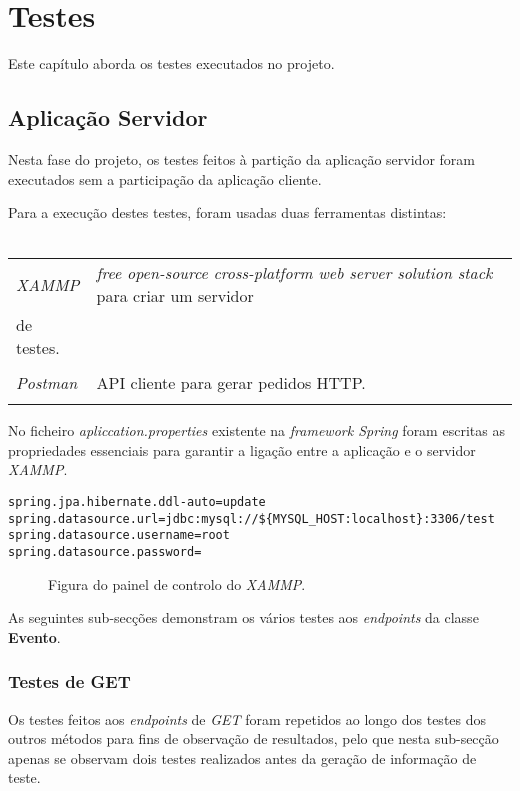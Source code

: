 %
%
\chapter{Testes} \label{testes}
Este capítulo aborda os testes executados no projeto.

\section{Aplicação Servidor} \label{sec51}
Nesta fase do projeto, os testes feitos à partição da aplicação servidor foram executados sem a participação da aplicação cliente.

Para a execução destes testes, foram usadas duas ferramentas distintas:\\
\\
\begin{tabular}{ll}
	\emph{XAMMP} & \emph{free open-source cross-platform web server solution stack} para criar um servidor\\
	 de testes.\\
	 \\
	\emph{Postman} & API cliente para gerar pedidos HTTP.\\
	\\
\end{tabular}

No ficheiro \emph{apliccation.properties} existente na \emph{framework Spring} foram escritas as propriedades essenciais para garantir a ligação entre a aplicação e o servidor \emph{XAMMP}.

\begin{verbatim}
spring.jpa.hibernate.ddl-auto=update
spring.datasource.url=jdbc:mysql://${MYSQL_HOST:localhost}:3306/test
spring.datasource.username=root
spring.datasource.password=
\end{verbatim}

\begin{figure}[h]
	\begin{center}
	\end{center}
	\caption{Figura do painel de controlo do \emph{XAMMP}.}\label{fig:logotipo}
\end{figure}

As seguintes sub-secções demonstram os vários testes aos \emph{endpoints} da classe {\bf Evento}.\\


\subsection{Testes de GET}\label{511}
Os testes feitos aos \emph{endpoints} de \emph{GET} foram repetidos ao longo dos testes dos outros métodos para fins de observação de resultados, pelo que nesta sub-secção apenas se observam dois testes realizados antes da geração de informação de teste.\\


